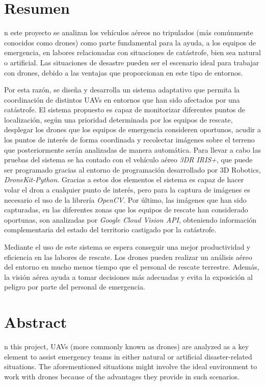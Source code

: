 \chapter{Resumen}

n este proyecto se analizan los vehículos aéreos no tripulados (más comúnmente conocidos como drones) como parte fundamental para la ayuda, a los equipos de emergencia, en labores relacionadas con situaciones de catástrofe, bien sea natural o artificial. Las situaciones de desastre pueden ser el escenario ideal para trabajar con drones, debido a las ventajas que proporcionan en este tipo de entornos.

Por esta razón, se diseña y desarrolla un sistema adaptativo que permita la coordinación de distintos \acs{UAV}s en entornos que han sido afectados por una catástrofe. El sistema propuesto es capaz de monitorizar diferentes puntos de localización, según una prioridad determinada por los equipos de rescate, desplegar los drones que los equipos de emergencia consideren oportunos, acudir a los puntos de interés de forma coordinada y recolectar imágenes sobre el terreno que posteriormente serán analizadas de manera automática. Para llevar a cabo las pruebas del sistema se ha contado con el vehículo aéreo \textit{3DR IRIS+}, que puede ser programado gracias al entorno de programación desarrollado por 3D Robotics, \textit{DroneKit-Python}. Gracias a estos dos elementos el sistema es capaz de hacer volar el dron a cualquier punto de interés, pero para la captura de imágenes es necesario el uso de la librería \textit{OpenCV}. Por último, las imágenes que han sido capturadas, en las diferentes zonas que los equipos de rescate han considerado oportunas, son analizadas por \textit{Google Cloud Vision \acs{API}}, obteniendo información complementaria del estado del territorio castigado por la catástrofe.

Mediante el uso de este sistema se espera conseguir una mejor productividad y eficiencia en las labores de rescate. Los drones pueden realizar un análisis aéreo del entorno en mucho menos tiempo que el personal de rescate terrestre. Además, la visión aérea ayuda a tomar decisiones más adecuadas y evita la exposición al peligro por parte del personal de emergencia.

\chapter{Abstract}

n this project, \acs{UAV}s (more commonly known as drones) are analyzed as a key element to assist emergency teams in either natural or artificial disaster-related situations. The aforementioned situations might involve the ideal environment to work with drones because of the advantages they provide in such scenarios.

